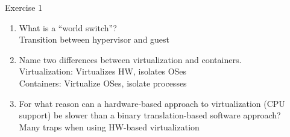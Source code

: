 \documentclass[10pt]{beamer}
\begin{document}
\begin{frame}{Exercise 1}
\begin{enumerate}
{		}
		
		\item What is a ``world switch''?\\
		\alert{Transition between hypervisor and guest}
		\framebreak
		
		\item Name two differences between virtualization and containers. \\
		\alert{Virtualization: Virtualizes HW, isolates OSes \\
		Containers: Virtualize OSes, isolate processes}
		
		\item For what reason can a hardware-based approach to virtualization (CPU support) be slower than a binary translation-based software approach? \\
		\alert{Many traps when using HW-based virtualization}
	\end{enumerate}
\end{frame}
\end{document}

